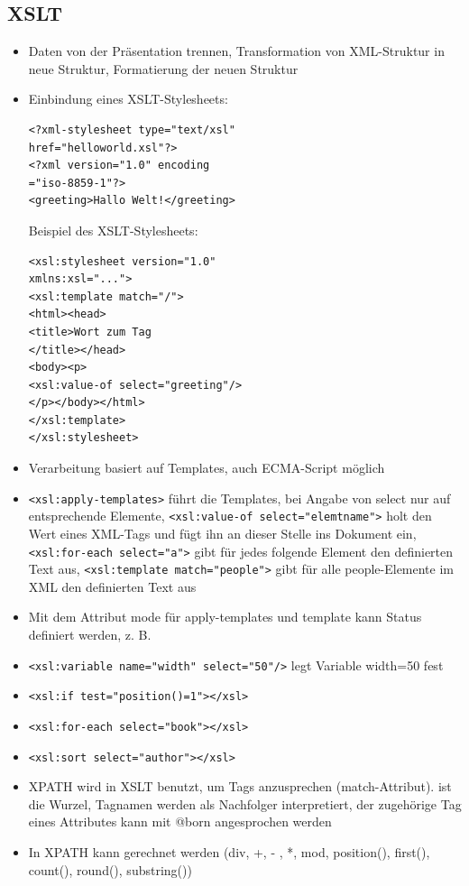 \documentclass[12pt,landscape]{article}
\begin{document}
\begin{multicols}{3}
\section{XSLT}
\begin{itemize}
\item Daten von der Präsentation trennen, Transformation von XML-Struktur in neue Struktur, Formatierung der neuen Struktur
\item Einbindung eines XSLT-Stylesheets:\\
\begin{lstlisting}
<?xml-stylesheet type="text/xsl"
href="helloworld.xsl"?>
<?xml version="1.0" encoding
="iso-8859-1"?>
<greeting>Hallo Welt!</greeting>
\end{lstlisting}
Beispiel des XSLT-Stylesheets:
\begin{lstlisting}
<xsl:stylesheet version="1.0"
xmlns:xsl="...">
<xsl:template match="/">
<html><head>
<title>Wort zum Tag
</title></head>
<body><p>
<xsl:value-of select="greeting"/>
</p></body></html>
</xsl:template>
</xsl:stylesheet>
\end{lstlisting}
\item Verarbeitung basiert auf Templates, auch ECMA-Script möglich
\item \lstinline|<xsl:apply-templates>| führt die Templates, bei Angabe von select nur auf entsprechende Elemente, \lstinline|<xsl:value-of select="elemtname">| holt den Wert eines XML-Tags und fügt ihn an dieser Stelle ins Dokument ein, \lstinline|<xsl:for-each select="a">| gibt für jedes folgende Element den definierten Text aus, \lstinline|<xsl:template match="people">| gibt für alle people-Elemente im XML den definierten Text aus
\item Mit dem Attribut mode für apply-templates und template kann Status definiert werden, z. B.
\item \lstinline|<xsl:variable name="width" select="50"/>| legt Variable width=50 fest
\item \lstinline|<xsl:if test="position()=1"></xsl>|
\item \lstinline|<xsl:for-each select="book"></xsl>|
\item \lstinline|<xsl:sort select="author"></xsl>|
\item XPATH wird in XSLT benutzt, um Tags anzusprechen (match-Attribut). \/ ist die Wurzel, Tagnamen werden als Nachfolger interpretiert, der zugehörige Tag eines Attributes kann mit @born angesprochen werden
\item In XPATH kann gerechnet werden (div, +, - , *, mod, position(), first(), count(), round(), substring())
\end{itemize}



\end{multicols}
\end{document}
